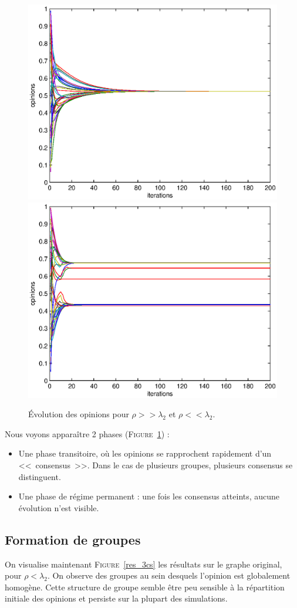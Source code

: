 \documentclass[12pt]{article}
\newcommand{\fig}[1]{\textsc{Figure}~\ref{#1}}
\begin{document}
\begin{figure}[htb]
	\begin{center}
		\includegraphics[width=.4\textwidth]{evolution_ok}
		\includegraphics[width=.4\textwidth]{evolution_clusters}
	\end{center}
	\caption{Évolution des opinions pour $\rho >> \lambda_2$ et $\rho << \lambda_2$.}
	\label{fig:evol}
\end{figure}

Nous voyons apparaître 2 phases (\fig{fig:evol}) :
\begin{itemize}
	\item Une phase transitoire, où les opinions se rapprochent rapidement d'un <<~consensus~>>.
		Dans le cas de plusieurs groupes, plusieurs consensus se distinguent.
	\item Une phase de régime permanent : une fois les consensus atteints, aucune évolution n'est visible.
\end{itemize}


\subsection{Formation de groupes}
On visualise maintenant \fig{res_3cs} les résultats sur le graphe original, pour
$\rho < \lambda_2$. On observe des groupes au sein desquels l'opinion
est globalement homogène. Cette structure de groupe semble être peu
sensible à la répartition initiale des opinions et persiste
sur la plupart des simulations.
\end{document}
